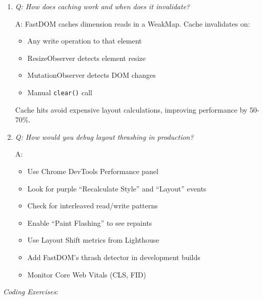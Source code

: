 \documentclass[11pt]{article}
\begin{document}
\begin{enumerate}
\item \emph{Q: How does caching work and when does it invalidate?}

A: FastDOM caches dimension reads in a WeakMap. Cache invalidates on:
\begin{itemize}
\item Any write operation to that element
\item ResizeObserver detects element resize
\item MutationObserver detects DOM changes
\item Manual \texttt{clear()} call
\end{itemize}

Cache hits avoid expensive layout calculations, improving performance by 50-70\%.

\item \emph{Q: How would you debug layout thrashing in production?}

A:
\begin{itemize}
\item Use Chrome DevTools Performance panel
\item Look for purple ``Recalculate Style'' and ``Layout'' events
\item Check for interleaved read/write patterns
\item Enable ``Paint Flashing'' to see repaints
\item Use Layout Shift metrics from Lighthouse
\item Add FastDOM's thrash detector in development builds
\item Monitor Core Web Vitals (CLS, FID)
\end{itemize}
\end{enumerate}

\emph{Coding Exercises}:
\end{document}

